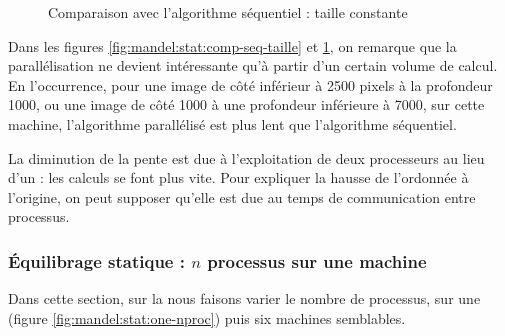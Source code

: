 \begin{figure}
  \centering


  \caption{Comparaison avec l'algorithme séquentiel : taille
    constante}
  \label{fig:mandel:stat:comp-seq-prof}
\end{figure}

Dans les figures \ref{fig:mandel:stat:comp-seq-taille} et
\ref{fig:mandel:stat:comp-seq-prof}, on remarque que la
parallélisation ne devient intéressante qu'à partir d'un certain
volume de calcul. En l'occurrence, pour une image de côté inférieur
à 2500 pixels à la profondeur 1000, ou une image de côté 1000 à une
profondeur inférieure à 7000, sur cette machine, l'algorithme
parallélisé est plus lent que l'algorithme séquentiel.

La diminution de la pente est due à l'exploitation de deux processeurs
au lieu d'un : les calculs se font plus vite. Pour expliquer la hausse
de l'ordonnée à l'origine, on peut supposer qu'elle est due au temps
de communication entre processus.


\subsubsection{Équilibrage statique : $n$ processus sur une machine}

Dans cette section, sur la nous faisons varier le nombre de processus,
sur une (figure \ref{fig:mandel:stat:one-nproc}) puis six machines
semblables.

